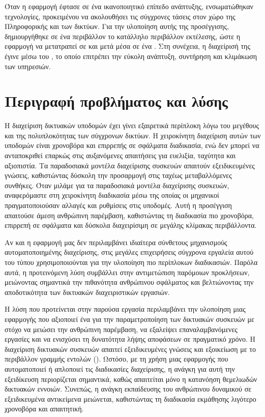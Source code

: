 Όταν η εφαρμογή έφτασε σε ένα ικανοποιητικό επίπεδο ανάπτυξης, ενσωματώθηκαν  τεχνολογίες, προκειμένου να ακολουθήσει τις σύγχρονες τάσεις στον χώρο της Πληροφορικής και των δικτύων. 
Για την υλοποίηση αυτής της προσέγγισης, δημιουργήθηκε σε ένα  περιβάλλον το κατάλληλο περιβάλλον εκτέλεσης, ώστε η εφαρμογή να μετατραπεί σε  και μετά  μέσα σε ένα . Στη συνέχεια, η διαχείρισή της έγινε μέσω του , το οποίο επιτρέπει την εύκολη ανάπτυξη, συντήρηση και κλιμάκωση των υπηρεσιών.


\section{Περιγραφή προβλήματος και λύσης}
Η διαχείριση δικτυακών υποδομών έχει γίνει εξαιρετικά περίπλοκη λόγω του μεγέθους και της πολυπλοκότητας των σύγχρονων δικτύων. 
Η χειροκίνητη διαχείριση αυτών των υποδομών είναι χρονοβόρα και επιρρεπής σε σφάλματα διαδικασία, ενώ δεν μπορεί να ανταποκριθεί επαρκώς στις 
αυξανόμενες απαιτήσεις για ευελιξία, ταχύτητα και αξιοπιστία. Τα παραδοσιακά μοντέλα διαχείρισης συσκευών απαιτούν εξειδικευμένες γνώσεις, 
καθιστώντας δύσκολη την προσαρμογή στις ταχέως μεταβαλλόμενες συνθήκες. Όταν μιλάμε για τα παραδοσιακά μοντέλα διαχείρισης συσκευών, αναφερόμαστε στη χειροκίνητη διαδικασία μέσω της οποίας οι μηχανικοί πραγματοποιούσαν αλλαγές και ρυθμίσεις στις υποδομές. Αυτή η προσέγγιση απαιτούσε άμεση ανθρώπινη παρέμβαση, καθιστώντας τη διαδικασία πιο χρονοβόρα, επιρρεπή σε σφάλματα και δύσκολα διαχειρίσιμη σε μεγάλης κλίμακας περιβάλλοντα. 

Αν και η εφαρμογή μας δεν περιλαμβάνει ιδιαίτερα σύνθετους μηχανισμούς αυτοματοποιημένης διαχείρισης, στις μεγάλες επιχειρήσεις 
σύγχρονα εργαλεία αυτού του τύπου χρησιμοποιούνται για την υλοποίηση πιο περίπλοκων διαδικασιών. Παρόλα αυτά, η προτεινόμενη λύση συμβάλλει στην αντιμετώπιση παρόμοιων προκλήσεων, μειώνοντας σημαντικά την πιθανότητα ανθρώπινου σφάλματος και βελτιώνοντας την αποδοτικότητα των δικτυακών διαχειριστικών εργασιών.


Η λύση που προτείνεται στην παρούσα εργασία περιλαμβάνει την υλοποίηση μιας εφαρμογής που αξιοποιεί ένα  για την παραμετροποίηση των δικτυακών συσκευών με στόχο να μειώσει την ανθρώπινη παρέμβαση, να εξαλείψει επαναλαμβανόμενες εργασίες και να ενισχύσει τη δυνατότητα λήψης αποφάσεων σε πραγματικό χρόνο. Η διαχείριση δικτυακών συσκευών απαιτεί εξειδικευμένες γνώσεις και εξοικείωση με το περιβάλλον γραμμής εντολών (). Ωστόσο, με τη χρήση μιας εφαρμογής που αυτοματοποιεί ή απλοποιεί τις διαδικασίες διαχείρισης, η ανάγκη για αυτή την εξειδίκευση περιορίζεται σημαντικά, καθώς απαιτείται μόνο η κατανόηση θεμελιωδών δικτυακών εννοιών. Συνεπώς, η ανάγκη εκπαίδευσης του ανθρώπινου δυναμικού σε εξειδικευμένα αντικείμενα μειώνεται, καθιστώντας τη διαδικασία εκμάθησης λιγότερο χρονοβόρα και απαιτητική.

